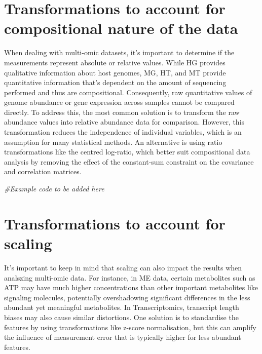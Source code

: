 \documentclass[
]{book}
\newenvironment{Shaded}{\begin{snugshade}}{\end{snugshade}}
\newcommand{\CommentTok}[1]{\textcolor[rgb]{0.56,0.35,0.01}{\textit{#1}}}
\begin{document}
\hypertarget{transformations-to-account-for-compositional-nature-of-the-data}{%
\section{Transformations to account for compositional nature of the data}\label{transformations-to-account-for-compositional-nature-of-the-data}}

When dealing with multi-omic datasets, it's important to determine if the measurements represent absolute or relative values. While HG provides qualitative information about host genomes, MG, HT, and MT provide quantitative information that's dependent on the amount of sequencing performed and thus are compositional. Consequently, raw quantitative values of genome abundance or gene expression across samples cannot be compared directly. To address this, the most common solution is to transform the raw abundance values into relative abundance data for comparison. However, this transformation reduces the independence of individual variables, which is an assumption for many statistical methods. An alternative is using ratio transformations like the centred log-ratio, which better suit compositional data analysis by removing the effect of the constant-sum constraint on the covariance and correlation matrices.

\begin{Shaded}
\begin{Highlighting}[]
\CommentTok{\#Example code to be added here}
\end{Highlighting}
\end{Shaded}

\hypertarget{transformations-to-account-for-scaling}{%
\section{Transformations to account for scaling}\label{transformations-to-account-for-scaling}}

It's important to keep in mind that scaling can also impact the results when analszing multi-omic data. For instance, in ME data, certain metabolites such as ATP may have much higher concentrations than other important metabolites like signaling molecules, potentially overshadowing significant differences in the less abundant yet meaningful metabolites. In Transcriptomics, transcript length biases may also cause similar distortions. One solution is to standardise the features by using transformations like z-score normalisation, but this can amplify the influence of measurement error that is typically higher for less abundant features.
\end{document}
